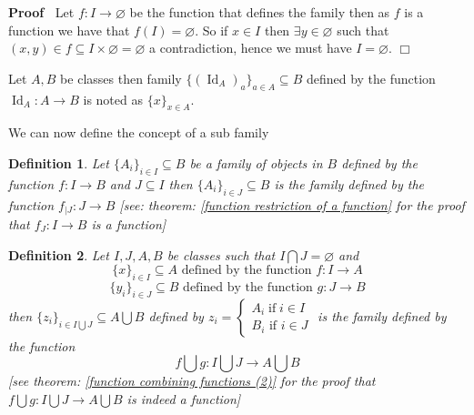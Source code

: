 \documentclass{book}
\newcommand{\tmop}[1]{\ensuremath{\operatorname{#1}}}
\newenvironment{proof}{\noindent\textbf{Proof\ }}{\hspace*{\fill}$\Box$\medskip}
\newtheorem{definition}{Definition}
{\theorembodyfont{\rmfamily}\newtheorem{example}{Example}}
\begin{document}
\begin{proof}
  Let $f : I \rightarrow \varnothing$ be the function that defines the family
  then as $f$ is a function we have that $f (I) = \varnothing$. So if $x \in
  I$ then $\exists y \in \varnothing$ such that $(x, y) \in f \subseteq I
  \times \varnothing = \varnothing$ a contradiction, hence we must have $I =
  \varnothing$.
\end{proof}

\begin{example}
  \label{family {x}xeA}Let $A, B$ be classes then family $\{ (\tmop{Id}_A)_a
  \}_{a \in A} \subseteq B$ defined by the function $\tmop{Id}_A : A
  \rightarrow B$ is noted as $\{ x \}_{x \in A}$.
\end{example}

We can now define the concept of a sub family

\begin{definition}
  \label{family definition (2)}Let $\{ A_i \}_{i \in I} \subseteq B$ be a
  family of objects in $B$ defined by the function $f : I \rightarrow B$ and
  $J \subseteq I$ then $\{ A_i \}_{i \in J} \subseteq B$ is the family defined
  by the function $f_{|J} : J \rightarrow B$ [see: theorem: \ref{function
  restriction of a function} for the proof that $f_J : I \rightarrow B$ is a
  function]
\end{definition}

\begin{definition}
  \label{family definition (3)}Let $I, J, A, B$ be classes such that $I
  \bigcap J = \varnothing$ and
  \[ \{ x \}_{i \in I} \subseteq A \text{ defined by the function } f : I
     \rightarrow A \]
  \[ \{ y_i \}_{i \in J} \subseteq B \text{ defined by the function } g : J
     \rightarrow B \]
  then $\{ z_i \}_{i \in I \bigcup J} \subseteq A \bigcup B$ defined by $z_i =
  \left\{\begin{array}{l}
    A_i \tmop{if} i \in I\\
    B_i \text{ if } i \in J
  \end{array}\right.$ is the family defined by the function
  \[ f \bigcup g : I \bigcup J \rightarrow A \bigcup B \]
  [see theorem: \ref{function combining functions (2)} for the proof that $f
  \bigcup g : I \bigcup J \rightarrow A \bigcup B$ is indeed a function]
\end{definition}
\end{document}
